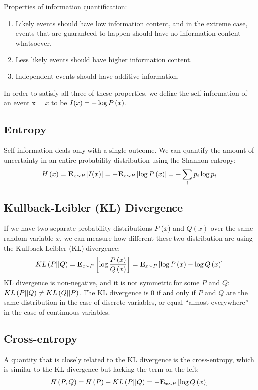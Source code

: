 Properties of information quantification:
\begin{enumerate}
	\item Likely events should have low information content, and in the extreme case, events that are guaranteed to happen should have no information content whatsoever.
	\item Less likely events should have higher information content.
	\item Independent events should have additive information.
\end{enumerate}
In order to satisfy all three of these properties, we define the self-information of an event $\mathtt{x}=x$ to be $I(x)=-\log\P{x}$.

\subsection{Entropy}
Self-information deals only with a single outcome. We can quantify the amount of uncertainty in an entire probability distribution using the Shannon entropy:
\begin{align*}
	\H{x}=\Ep{x\sim P}{I(x)}=-\Ep{x\sim P}{\log\P{x}}=-\sum_i p_i\log p_i
\end{align*}

\subsection{Kullback-Leibler (KL) Divergence}

If we have two separate probability distributions $\P{x}$ and $Q\left(x\right)$ over the same random variable $x$, we can measure how different these two distribution are using the Kullback-Leibler (KL) divergence:
\begin{align*}
	\KL{P}{Q}=\Ep{x\sim P}{\log\frac{\P{x}}{Q\left(x\right)}}=\Ep{x\sim P}{\log\P{x}-\log Q\left(x\right)}
\end{align*}
KL divergence is non-negative, and it is not symmetric for some $P$ and $Q$: $\KL{P}{Q}\neq\KL{Q}{P}$. The KL divergence is 0 if and only if $P$ and $Q$ are the same distribution in the case of discrete variables, or equal ``almost everywhere'' in the case of continuous variables.

\subsection{Cross-entropy}

A quantity that is closely related to the KL divergence is the cross-entropy, which is similar to the KL divergence but lacking the term on the left:
\begin{align*}
	\H{P,Q}=\H{P}+\KL{P}{Q}=-\Ep{x\sim P}{\log Q\left(x\right)}
\end{align*}

